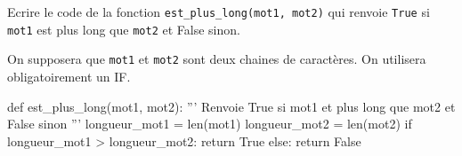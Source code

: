 \documentclass[a4paper,10pt]{report}
\def\ptsexoC{2}
\begin{document}
\bigskip

\exods{\ptsexoC}

Ecrire le code de la fonction \verb|est_plus_long(mot1, mot2)| qui renvoie \verb|True| si \verb|mot1| est plus long que \verb|mot2| et False sinon.

On supposera que \verb|mot1| et \verb|mot2| sont deux chaines de caractères. On utilisera obligatoirement un IF.

\begin{CodePythontexAlt}[TaillePolice=\large,Largeur=1\linewidth,Centre,PremLigne=1]{}
def est_plus_long(mot1, mot2):
    ''' Renvoie True si mot1 et plus long que mot2 et False sinon '''
    longueur_mot1 = len(mot1)
    longueur_mot2 = len(mot2)
    if longueur_mot1 > longueur_mot2:
        return True
    else:
        return False
\end{CodePythontexAlt}


\bigskip
\end{document}
